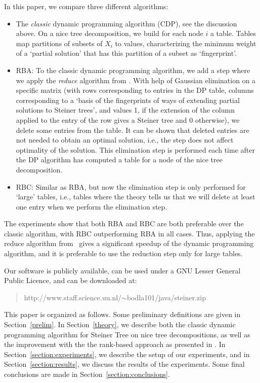 \documentclass{llncs}
\begin{document}
In this paper, we compare three different algorithms:
\begin{itemize}
\item The {\em classic} dynamic programming algorithm (CDP), see the discussion above. On a nice tree decomposition,
we build for each node $i$ a table. Tables map partitions of subsets of $X_i$ to values,
characterizing the minimum weight of a `partial solution' that has this partition of a subset
as `fingerprint'. 
\item RBA: To the classic dynamic programming algorithm, we add a step where we
apply the {\em reduce} algorithm from \cite{BodlaenderCKN12}. With help of Gaussian elimination
on a specific matrix (with rows corresponding to entries in the DP table, columns
corresponding to a `basis of the fingerprints of ways of extending partial solutions to
Steiner trees', and values 1, if the extension of the column applied to the entry of the row
gives a Steiner tree and 0 otherwise), we delete some entries from the table. It can be
shown that deleted entries are not needed to obtain an optimal solution, i.e., the
step does not affect optimality of the solution. This elimination step is performed each
time after the DP algorithm has computed a table for a node of the nice tree decomposition.
\item RBC: Similar as RBA, but now the elimination step is only performed for `large'
tables, i.e., tables where the theory tells us that we will delete at least one entry when
we perform the elimination step.
\end{itemize}

The experiments show that both RBA and RBC are both preferable over
the classic algorithm, with RBC outperforming RBA in all cases. Thus, applying
the reduce algorithm from~\cite{BodlaenderCKN12} gives a significant speedup of the
dynamic programming algorithm, and it is preferable to use the reduction step only
for large tables.






Our software is publicly available, can be used under a GNU Lesser General Public Licence,
and can be downloaded at:
\begin{verse}
http://www.staff.science.uu.nl/$\sim$bodla101/java/steiner.zip
\end{verse}

This paper is organized as follows.
Some preliminary definitions are given in Section~\ref{prelim}. 
In Section~\ref{theory}, we describe both the classic dynamic
programming algorithm for Steiner
Tree on nice tree decompositions, as well as the improvement with the
 the rank-based approach as presented in \cite{BodlaenderCKN12}. 
In Section~\ref{section:experiments}, we describe the setup of our experiments,
and in Section~\ref{section:results}, we discuss the results of the experiments.
Some final conclusions are made in Section~\ref{section:conclusions}.
\end{document}
